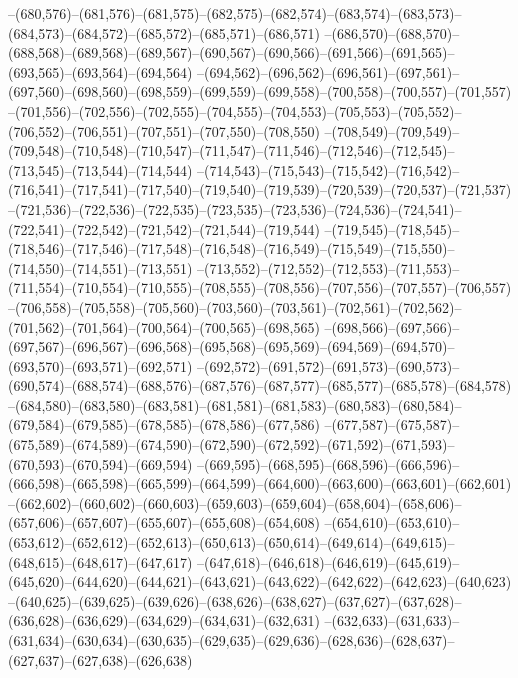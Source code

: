 --(680,576)--(681,576)--(681,575)--(682,575)--(682,574)--(683,574)--(683,573)--(684,573)--(684,572)--(685,572)--(685,571)--(686,571)
--(686,570)--(688,570)--(688,568)--(689,568)--(689,567)--(690,567)--(690,566)--(691,566)--(691,565)--(693,565)--(693,564)--(694,564)
--(694,562)--(696,562)--(696,561)--(697,561)--(697,560)--(698,560)--(698,559)--(699,559)--(699,558)--(700,558)--(700,557)--(701,557)
--(701,556)--(702,556)--(702,555)--(704,555)--(704,553)--(705,553)--(705,552)--(706,552)--(706,551)--(707,551)--(707,550)--(708,550)
--(708,549)--(709,549)--(709,548)--(710,548)--(710,547)--(711,547)--(711,546)--(712,546)--(712,545)--(713,545)--(713,544)--(714,544)
--(714,543)--(715,543)--(715,542)--(716,542)--(716,541)--(717,541)--(717,540)--(719,540)--(719,539)--(720,539)--(720,537)--(721,537)
--(721,536)--(722,536)--(722,535)--(723,535)--(723,536)--(724,536)--(724,541)--(722,541)--(722,542)--(721,542)--(721,544)--(719,544)
--(719,545)--(718,545)--(718,546)--(717,546)--(717,548)--(716,548)--(716,549)--(715,549)--(715,550)--(714,550)--(714,551)--(713,551)
--(713,552)--(712,552)--(712,553)--(711,553)--(711,554)--(710,554)--(710,555)--(708,555)--(708,556)--(707,556)--(707,557)--(706,557)
--(706,558)--(705,558)--(705,560)--(703,560)--(703,561)--(702,561)--(702,562)--(701,562)--(701,564)--(700,564)--(700,565)--(698,565)
--(698,566)--(697,566)--(697,567)--(696,567)--(696,568)--(695,568)--(695,569)--(694,569)--(694,570)--(693,570)--(693,571)--(692,571)
--(692,572)--(691,572)--(691,573)--(690,573)--(690,574)--(688,574)--(688,576)--(687,576)--(687,577)--(685,577)--(685,578)--(684,578)
--(684,580)--(683,580)--(683,581)--(681,581)--(681,583)--(680,583)--(680,584)--(679,584)--(679,585)--(678,585)--(678,586)--(677,586)
--(677,587)--(675,587)--(675,589)--(674,589)--(674,590)--(672,590)--(672,592)--(671,592)--(671,593)--(670,593)--(670,594)--(669,594)
--(669,595)--(668,595)--(668,596)--(666,596)--(666,598)--(665,598)--(665,599)--(664,599)--(664,600)--(663,600)--(663,601)--(662,601)
--(662,602)--(660,602)--(660,603)--(659,603)--(659,604)--(658,604)--(658,606)--(657,606)--(657,607)--(655,607)--(655,608)--(654,608)
--(654,610)--(653,610)--(653,612)--(652,612)--(652,613)--(650,613)--(650,614)--(649,614)--(649,615)--(648,615)--(648,617)--(647,617)
--(647,618)--(646,618)--(646,619)--(645,619)--(645,620)--(644,620)--(644,621)--(643,621)--(643,622)--(642,622)--(642,623)--(640,623)
--(640,625)--(639,625)--(639,626)--(638,626)--(638,627)--(637,627)--(637,628)--(636,628)--(636,629)--(634,629)--(634,631)--(632,631)
--(632,633)--(631,633)--(631,634)--(630,634)--(630,635)--(629,635)--(629,636)--(628,636)--(628,637)--(627,637)--(627,638)--(626,638)
